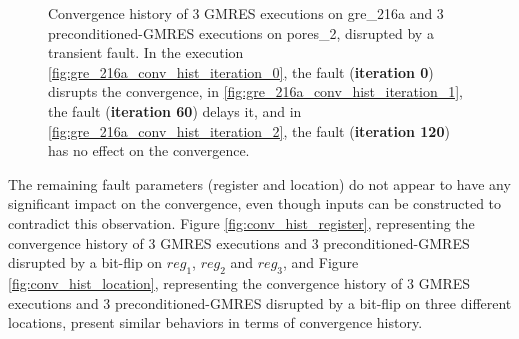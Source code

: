 \documentclass[twoside]{article}
\newcounter{fig}\setcounter{fig}{0}
\begin{document}
\begin{figure}[H]
\begin{minipage}[b]{0.48\linewidth}
      
    \end{minipage}
    \caption{Convergence history of 3 GMRES executions on gre_216a and 3 preconditioned-GMRES executions on pores_2, disrupted by a transient fault. In the execution \ref{fig:gre_216a_conv_hist_iteration_0}, the fault (\textbf{iteration 0}) disrupts the convergence, in \ref{fig:gre_216a_conv_hist_iteration_1}, the fault (\textbf{iteration 60}) delays it, and in \ref{fig:gre_216a_conv_hist_iteration_2}, the fault (\textbf{iteration 120}) has no effect on the convergence.}\label{fig:conv_hist_iteration}
  \end{figure}




  The remaining fault parameters (register and location) do not appear to have any significant impact on the convergence, even though inputs can be constructed to contradict this observation. Figure \ref{fig:conv_hist_register}, representing the convergence history of 3 GMRES executions and 3 preconditioned-GMRES disrupted by a bit-flip on $reg_1$, $reg_2$ and $reg_3$, and Figure \ref{fig:conv_hist_location}, representing the convergence history of 3 GMRES executions and 3 preconditioned-GMRES disrupted by a bit-flip on three different locations, present similar behaviors in terms of convergence history.
\end{document}
